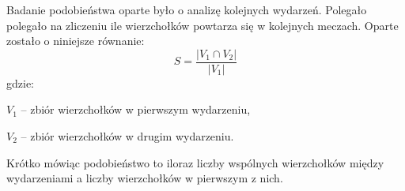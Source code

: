 Badanie podobieństwa oparte było o analizę kolejnych wydarzeń. 
Polegało polegało na zliczeniu ile wierzchołków powtarza się w kolejnych meczach.
Oparte zostało o niniejsze równanie:
\begin{equation}
S = \frac{|V_1 \cap V_2|}{|V_1|}
\end{equation}  
gdzie:

$V_1$ -- zbiór wierzchołków w pierwszym wydarzeniu,

$V_2$ -- zbiór wierzchołków w drugim wydarzeniu.

Krótko mówiąc podobieństwo to iloraz liczby wspólnych wierzchołków między 
wydarzeniami a liczby wierzchołków w pierwszym z nich.

